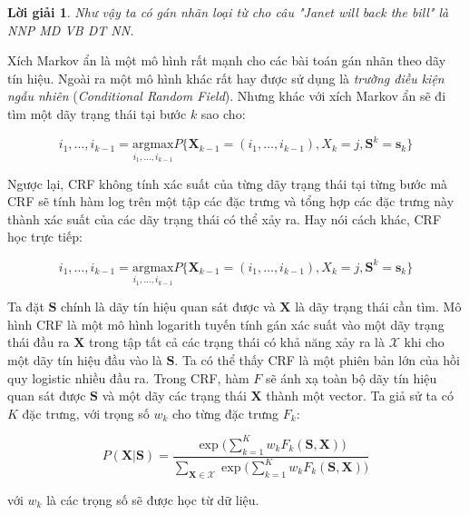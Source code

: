 \documentclass[14pt, a4paper]{article}
\numberwithin{equation}{section}
\numberwithin{figure}{section}
\theoremstyle{sltheorem}
\theoremstyle{soltheorem}
\newtheorem*{loigiai}{Lời giải}
\numberwithin{dl}{section}
\numberwithin{md}{section}
\numberwithin{vd}{section}
\begin{document}
\begin{loigiai}
        Như vậy ta có gán nhãn loại từ cho câu "Janet will back the bill" là NNP MD VB DT NN.

    \end{loigiai}

    Xích Markov ẩn là một mô hình rất mạnh cho các bài toán gán nhãn theo dãy tín hiệu.
    Ngoài ra một mô hình khác rất hay được sử dụng là \textit{trường điều kiện ngẫu nhiên} (\textit{Conditional Random Field}).
    Nhưng khác với xích Markov ẩn sẽ đi tìm một dãy trạng thái tại bước $k$ sao cho:

    \begin{equation*}
        i_1, \dots, i_{k-1} = \underset{i_1, \dots, i_{k-1}}{\mathrm{argmax}} P \lbrace \mathbf{X}_{k-1} = (i_1, \dots, i_{k-1}), X_k = j, \mathbf{S}^k = \mathbf{s}_k \rbrace
    \end{equation*}

    Ngược lại, CRF không tính xác suất của từng dãy trạng thái tại từng bước mà CRF sẽ tính hàm log trên một tập các đặc trưng và tổng hợp các đặc trưng này thành xác suất của các dãy trạng thái có thể xảy ra.
    Hay nói cách khác, CRF học trực tiếp:

    \begin{equation*}
        i_1, \dots, i_{k-1} = \underset{i_1, \dots, i_{k-1}}{\mathrm{argmax}} P \lbrace \mathbf{X}_{k-1} = (i_1, \dots, i_{k-1}), X_k = j, \mathbf{S}^k = \mathbf{s}_k \rbrace
    \end{equation*}

    Ta đặt $\mathbf{S}$ chính là dãy tín hiệu quan sát được và $\mathbf{X}$ là dãy trạng thái cần tìm.
    Mô hình CRF là một mô hình logarith tuyến tính gán xác suất vào một dãy trạng thái đầu ra $\mathbf{X}$ trong tập tất cả các trạng thái có khả năng xảy ra là $\mathscr{X}$ khi cho một dãy tín hiệu đầu vào là $\mathbf{S}$.
    Ta có thể thấy CRF là một phiên bản lớn của hồi quy logistic nhiều đầu ra.
    Trong CRF, hàm $F$ sẽ ánh xạ toàn bộ dãy tín hiệu quan sát được $\mathbf{S}$ và một dãy các trạng thái $\mathbf{X}$ thành một vector.
    Ta giả sử ta có $K$ đặc trưng, với trọng số $w_k$ cho từng đặc trưng $F_k$:

    \begin{equation*}
        P(\mathbf{X} \vert \mathbf{S}) = \dfrac{\exp\Bigg (\displaystyle\sum_{k=1}^K w_k F_k (\mathbf{S}, \mathbf{X}) \Bigg)}{\displaystyle\sum_{\mathbf{X} \in \mathscr{X}}\exp\Bigg (\sum_{k=1}^K w_k F_k (\mathbf{S}, \mathbf{X}) \Bigg)}
    \end{equation*}

    với $w_k$ là các trọng số sẽ được học từ dữ liệu.
    \newpage
    \printbibliography[title={TÀI LIỆU THAM KHẢO}]
\end{document}
